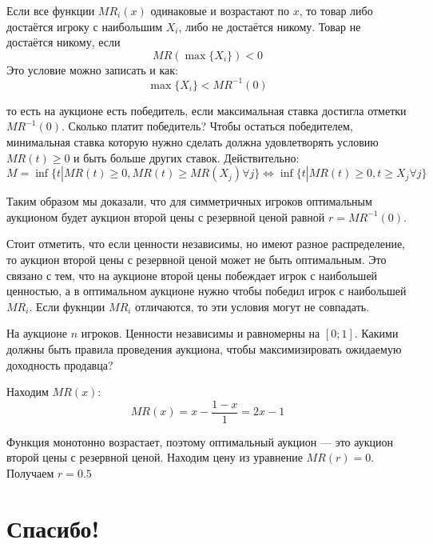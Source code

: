 \begin{myex} Если все функции $ MR_{i}(x) $ одинаковые и возрастают по $ x $, то товар либо достаётся игроку с наибольшим $ X_{i} $, либо не достаётся никому. Товар не достаётся никому, если
\begin{equation}
MR(\max\{X_{i}\})<0
\end{equation}
Это условие можно записать и как:
\begin{equation}
\max\{X_{i}\}<MR^{-1}(0)
\end{equation}

то есть на аукционе есть победитель, если максимальная ставка достигла отметки $ MR^{-1}(0) $. Сколько платит победитель? Чтобы остаться победителем, минимальная ставка которую нужно сделать должна удовлетворять условию $ MR(t)\geq 0 $ и быть больше других ставок. Действительно:
\begin{equation}
M=\inf\{ t| MR(t)\geq 0 , MR(t)\geq MR(X_{j}) \forall j \} \Longleftrightarrow \inf\{ t| MR(t)\geq 0 , t\geq X_{j} \forall j \}
\end{equation}

Таким образом мы доказали, что для симметричных игроков оптимальным аукционом будет аукцион второй цены с резервной ценой равной $ r=MR^{-1}(0) $.
\end{myex}


Стоит отметить, что если ценности независимы, но имеют разное распределение, то аукцион второй цены с резервной ценой может не быть оптимальным. Это связано с тем, что на аукционе второй цены побеждает игрок с наибольшей ценностью, а в оптимальном аукционе нужно чтобы победил игрок с наибольшей $ MR_{i} $. Если фукнции $ MR_{i} $ отличаются, то эти условия могут не совпадать.

\begin{myex} На аукционе $ n $ игроков. Ценности независимы и равномерны на $ [0;1] $. Какими должны быть правила проведения аукциона, чтобы максимизировать ожидаемую доходность продавца?

Находим $ MR(x)$:
\begin{equation}
MR(x)=x-\frac{1-x}{1}=2x-1
\end{equation}

Функция монотонно возрастает, поэтому оптимальный аукцион — это аукцион второй цены с резервной ценой. Находим цену из уравнение $ MR(r)=0 $. Получаем $ r=0.5 $
\end{myex}




\section{Спасибо!}

